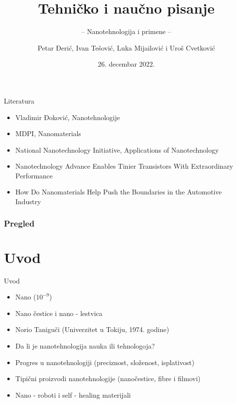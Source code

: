 \documentclass{beamer}
\title{Tehničko i naučno pisanje}
\subtitle{-- Nanotehnologija i primene --}
\author{Petar Đerić, Ivan Tešović, Luka Mijailović i Uroš Cvetković}
\institute{Matematički fakultet\\Univerzitet u Beogradu}
\date{
\footnotesize{26. decembar 2022.}
}
\begin{document}
\begin{frame}
\thispagestyle{empty}
\titlepage
\end{frame}

\addtocounter{framenumber}{-1}

\begin{frame}{Literatura}
\begin{itemize}
\item Vladimir Đoković, Nanotehnologije
\item MDPI, Nanomaterials
\item National Nanotechnology Initiative, Applications of Nanotechnology
\item Nanotechnology Advance Enables Tinier Transistors With Extraordinary Performance
\item How Do Nanomaterials Help Push the Boundaries in the Automotive Industry


\end{itemize}
\end{frame}

\begin{frame}
\frametitle{Pregled}
\tableofcontents[hidesubsections]
\end{frame}

\section{Uvod}

\begin{frame}{Uvod}
\begin{itemize}
\item Nano ($10^{-9}$) \\
\item Nano čestice i nano - lestvica
\item Norio Taniguči (Univerzitet u Tokiju, 1974. godine)

\item Da li je nanotehnologija nauka ili tehnologoja?
\item Progres u nanotehnologiji (preciznost, složenost, isplativost)
\item Tipični proizvodi nanotehnologije (nanočestice, fibre i filmovi)
\item Nano - roboti i self - healing materijali
\end{itemize}

\end{frame}
\end{document}
